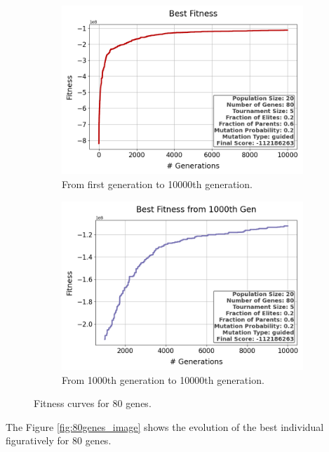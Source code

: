 \documentclass{assignment}
\begin{document}
\begin{figure}[H]
    \begin{subfigure}{0.5\textwidth}
        \includegraphics[width=\textwidth]{figures/best_fitness_output_20_80_5_0.2_0.6_0.2_guided.png}
        \caption{From first generation to 10000th generation.}
    \end{subfigure}\hfill
    \begin{subfigure}{0.5\textwidth}
        \includegraphics[width=\textwidth]{figures/best_fitness_1000_output_20_80_5_0.2_0.6_0.2_guided.png}
        \caption{From 1000th generation to 10000th generation.}
    \end{subfigure}
    \caption{Fitness curves for 80 genes.}
\label{fig:80genes}
\end{figure}

The Figure \ref{fig:80genes_image} shows the evolution of the best individual figuratively for 80 genes.
\end{document}
